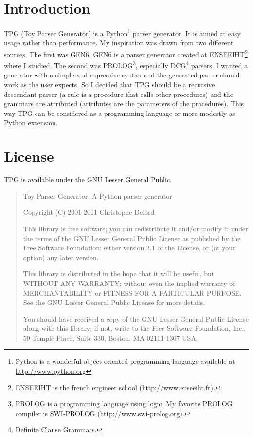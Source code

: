 \section{Introduction}

TPG (Toy Parser Generator) is a Python\footnote{Python is a wonderful object oriented programming language available at \url{http://www.python.org}} parser generator.
It is aimed at easy usage rather than performance.
My inspiration was drawn from two different sources.
The first was GEN6. GEN6 is a parser generator created at ENSEEIHT\footnote{ENSEEIHT is the french engineer school (\url{http://www.enseeiht.fr}).} where I studied.
The second was PROLOG\footnote{PROLOG is a programming language using logic. My favorite PROLOG compiler is SWI-PROLOG (\url{http://www.swi-prolog.org}).}, especially DCG\footnote{Definite Clause Grammars.} parsers.
I wanted a generator with a simple and expressive syntax and the generated parser should work as the user expects. So I decided that TPG should be a recursive descendant parser (a rule is a procedure that calls other procedures) and the grammars are attributed (attributes are the parameters of the procedures).
This way TPG can be considered as a programming language or more modestly as Python extension.

\section{License}

TPG is available under the GNU Lesser General Public.

\begin{quote}
Toy Parser Generator: A Python parser generator

Copyright (C) 2001-2011 Christophe Delord
 
This library is free software; you can redistribute it and/or
modify it under the terms of the GNU Lesser General Public
License as published by the Free Software Foundation; either
version 2.1 of the License, or (at your option) any later version.

This library is distributed in the hope that it will be useful,
but WITHOUT ANY WARRANTY; without even the implied warranty of
MERCHANTABILITY or FITNESS FOR A PARTICULAR PURPOSE.  See the GNU
Lesser General Public License for more details.

You should have received a copy of the GNU Lesser General Public
License along with this library; if not, write to the Free Software
Foundation, Inc., 59 Temple Place, Suite 330, Boston, MA  02111-1307  USA 
\end{quote}

